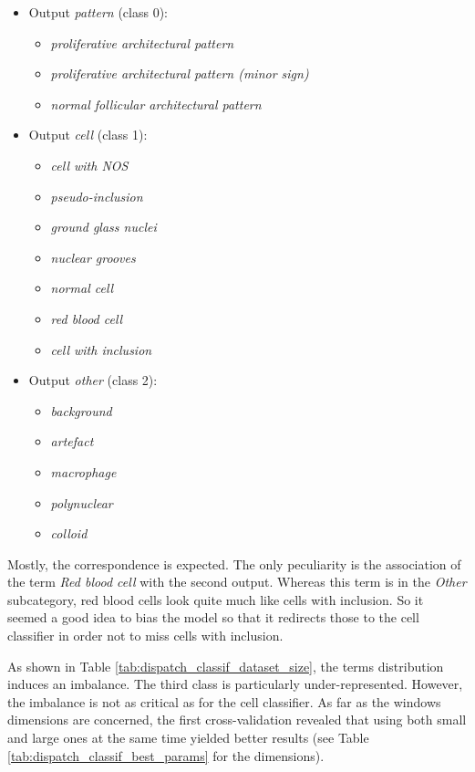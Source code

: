 \begin{itemize}
	\item Output \textit{pattern} (class 0): 
	\begin{itemize}
		\item \textit{proliferative architectural pattern}
		\item \textit{proliferative architectural pattern (minor sign)} 
		\item \textit{normal follicular architectural pattern}
	\end{itemize}
	\item Output \textit{cell} (class 1): 
	\begin{itemize}
		\item \textit{cell with NOS}
		\item \textit{pseudo-inclusion}
		\item \textit{ground glass nuclei}
		\item \textit{nuclear grooves}
		\item \textit{normal cell}
		\item \textit{red blood cell} 
		\item \textit{cell with inclusion}
	\end{itemize} 
	\item Output \textit{other} (class 2): 
	\begin{itemize}
		\item \textit{background}
		\item \textit{artefact}
		\item \textit{macrophage}
		\item \textit{polynuclear}
		\item \textit{colloid}
	\end{itemize} 
\end{itemize}

Mostly, the correspondence is expected. The only peculiarity is the association of the term \textit{Red blood cell} with the second output. Whereas this term is in the \textit{Other} subcategory, red blood cells look quite much like cells with inclusion. So it seemed a good idea to bias the model so that it redirects those to the cell classifier in order not to miss cells with inclusion. 

As shown in Table \ref{tab:dispatch_classif_dataset_size}, the terms distribution induces an imbalance. The third class is particularly under-represented. However, the imbalance is not as critical as for the cell classifier. As far as the windows dimensions are concerned, the first cross-validation revealed that using both small and large ones at the same time yielded better results (see Table \ref{tab:dispatch_classif_best_params} for the dimensions).

